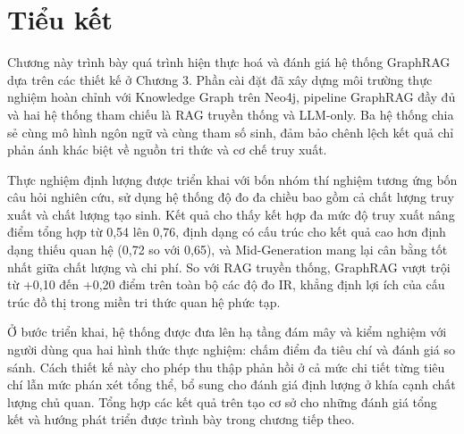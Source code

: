 
\section*{Tiểu kết}

Chương này trình bày quá trình hiện thực hoá và đánh giá hệ thống GraphRAG dựa trên các thiết kế ở Chương 3. Phần cài đặt đã xây dựng môi trường thực nghiệm hoàn chỉnh với Knowledge Graph trên Neo4j, pipeline GraphRAG đầy đủ và hai hệ thống tham chiếu là RAG truyền thống và LLM-only. Ba hệ thống chia sẻ cùng mô hình ngôn ngữ và cùng tham số sinh, đảm bảo chênh lệch kết quả chỉ phản ánh khác biệt về nguồn tri thức và cơ chế truy xuất.

Thực nghiệm định lượng được triển khai với bốn nhóm thí nghiệm tương ứng bốn câu hỏi nghiên cứu, sử dụng hệ thống độ đo đa chiều bao gồm cả chất lượng truy xuất và chất lượng tạo sinh. Kết quả cho thấy kết hợp đa mức độ truy xuất nâng điểm tổng hợp từ 0,54 lên 0,76, định dạng có cấu trúc cho kết quả cao hơn định dạng thiếu quan hệ (0,72 so với 0,65), và Mid-Generation mang lại cân bằng tốt nhất giữa chất lượng và chi phí. So với RAG truyền thống, GraphRAG vượt trội từ +0,10 đến +0,20 điểm trên toàn bộ các độ đo IR, khẳng định lợi ích của cấu trúc đồ thị trong miền tri thức quan hệ phức tạp.

Ở bước triển khai, hệ thống được đưa lên hạ tầng đám mây và kiểm nghiệm với người dùng qua hai hình thức thực nghiệm: chấm điểm đa tiêu chí và đánh giá so sánh. Cách thiết kế này cho phép thu thập phản hồi ở cả mức chi tiết từng tiêu chí lẫn mức phán xét tổng thể, bổ sung cho đánh giá định lượng ở khía cạnh chất lượng chủ quan. Tổng hợp các kết quả trên tạo cơ sở cho những đánh giá tổng kết và hướng phát triển được trình bày trong chương tiếp theo.

